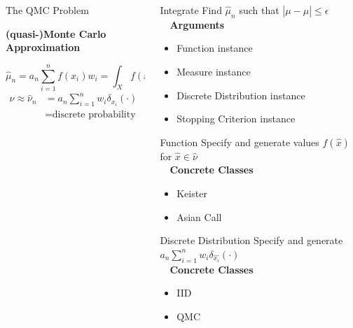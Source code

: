 \documentclass[final]{beamer}
\newcommand{\bfCenter}[1]{\centerline{\textbf{#1}}}
\newlength{\onecolwid}
\newlength{\threecolwid}
\newcommand{\dif}{\mathrm{d}}
\begin{document}
\begin{frame}[t]
\begin{columns}[t]
\begin{column}{\threecolwid}
\begin{columns}[t,totalwidth=\threecolwid]
\begin{column}{\onecolwid}
\begin{block}{The QMC Problem}
    \vspace{2ex}
    \bfCenter{(quasi-)Monte Carlo Approximation}
        \begin{equation*}
            \hat{\mu}_n = a_n \sum_{i=1}^{n} f(x_i)w_i =  \int_{X} f(x) \, \hat{\nu}( \dif x)
            \label{qmcApprox}
        \end{equation*}
        \begin{align*}
            \nu \approx \hat{\nu}_n & = a_n \sum_{i=1}^n w_i \delta_{\hat{x_i}}(\cdot) \\
            & = \text{discrete probability measure}
        \end{align*}
\end{block}
\end{column}


\begin{column}{\onecolwid}
\begin{alertblock}{Integrate}
    Find $\hat{\mu}_n$ such that $\left | \mu - \hat{\mu} \right  | \leq \epsilon$ \\[1ex]~\
    \textbf{Arguments}
    \begin{itemize}
        \item Function instance
        \item Measure instance
        \item Discrete Distribution instance
        \item Stopping Criterion instance
    \end{itemize}
\end{alertblock}

\begin{alertblock}{Function}
    Specify and generate values $f(\hat{x})$ for $\hat{x} \in \hat{\nu}$ \\[1ex]~\
    \textbf{Concrete Classes}
    \begin{itemize}
        \item Keister
        \item Asian Call
    \end{itemize}
\end{alertblock}

\begin{alertblock}{Discrete Distribution}
    Specify and generate $a_n \sum_{i=1}^n w_i \delta_{\hat{x_i}}(\cdot)$ \\[1ex]~\
    \textbf{Concrete Classes}
    \begin{itemize}
        \item IID
        \item QMC
    \end{itemize}
\end{alertblock}
\end{column} 


\end{columns}
\end{column}
\end{columns}
\end{frame}
\end{document}
